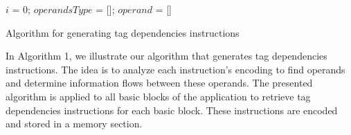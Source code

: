 \documentclass[10pt,a4paper, oneside]{memoir}
\begin{document}
\begin{algorithm}
	
	$i$ = 0;
	$operandsType$ = [];
	$operand$ = []\;
	\caption{Algorithm for generating tag dependencies instructions}
	\label{alg:static_analysis}
\end{algorithm}%
In Algorithm 1, we illustrate our algorithm that generates tag dependencies instructions. The idea is to analyze each instruction's encoding to find operands and determine information flows between these operands. The presented algorithm is applied to all basic blocks of the application to retrieve tag dependencies instructions for each basic block. These instructions are encoded and stored in a memory section. 
\end{document}
